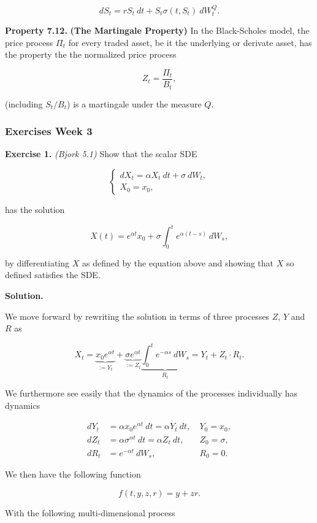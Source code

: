 \documentclass[
]{article}
\begin{document}
\[
dS_t=rS_t\ dt+S_t\sigma(t,S_t)\ dW_t^Q.
\]

\textbf{Property 7.12.} \textbf{(The Martingale Property)} In the
Black-Scholes model, the price process \(\Pi_t\) for every traded asset,
be it the underlying or derivate asset, has the property the the
normalized price process

\[
Z_t=\frac{\Pi_t}{B_t},
\]

(including \(S_t/B_t\)) is a martingale under the measure \(Q\).

\hypertarget{exercises-week-3}{%
\subsubsection{Exercises Week 3}\label{exercises-week-3}}

\textbf{Exercise 1.} \emph{(Bjork 5.1)} Show that the scalar SDE

\[
\left\{
\begin{matrix}
dX_t=\alpha X_t\ dt + \sigma\ dW_t,\\
X_0 = x_0,
\end{matrix}\right.
\]

has the solution

\[
X(t)=e^{\alpha t}x_0+ \sigma\int_0^te^{\alpha(t-s)}\ dW_s,
\]

by differentiating \(X\) as defined by the equation above and showing
that \(X\) so defined satisfies the SDE.

\textbf{Solution.}

We move forward by rewriting the solution in terms of three processes
\(Z\), \(Y\) and \(R\) as

\[
X_t=\underbrace{x_0e^{\alpha t}}_{:=Y_t}+\underbrace{\sigma e^{\alpha t}}_{:=Z_t} \underbrace{\int_0^t e^{-\alpha s}\ dW_s}_{R_t}=Y_t+Z_t\cdot R_t.
\]

We furthermore see easily that the dynamics of the processes
individually has dynamics

\begin{align*}
d Y_t&=\alpha x_0e^{\alpha t}\ dt=\alpha Y_t\ dt,\ &Y_0=x_0,\\
d Z_t&=\alpha \sigma^{\alpha t}\ dt=\alpha Z_t\ dt,\ &Z_0=\sigma,\\
d R_t&=e^{-\alpha t}\ dW_s,\ &R_0=0.
\end{align*}

We then have the following function

\[
f\left(t,y,z,r\right)=y+zr.
\]

With the following multi-dimensional process
\end{document}
